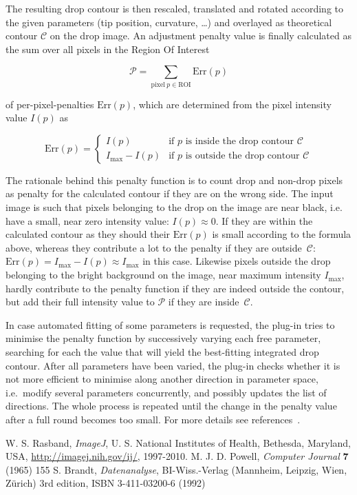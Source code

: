 \documentclass[fleqn]{scrartcl}
\begin{document}
The resulting drop contour is then rescaled, translated and rotated
according to the given parameters (tip position, curvature, \dots) and
overlayed as theoretical contour $\mathcal{C}$ on the drop image. An
adjustment penalty value is finally calculated as the sum over all
pixels in the Region Of Interest

\[
\mathcal{P} = \sum_{\mathrm{pixel}\ p \in \mathrm{ROI}} \mathrm{Err}(p)
\]

\noindent of per-pixel-penalties $\mathrm{Err}(p)$, which are
determined from the pixel intensity value $I(p)$ as

\[
\mathrm{Err}(p) = \left\{ \begin{array}{ll}
I(p) & \textrm{if } p \textrm{ is inside the drop contour } \mathcal{C} \\
I_{\mathrm{max}}-I(p) & 
\textrm{if } p \textrm{ is outside the drop contour } \mathcal{C}
\end{array} \right.
\]

The rationale behind this penalty function is to count drop and
non-drop pixels as penalty for the calculated contour if they are on
the wrong side. The input image is such that pixels belonging to the
drop on the image are near black, i.e. have a small, near zero intensity value: $I(p) \approx 0$. If they are within the calculated contour as they
should their $\mathrm{Err}(p)$ is small according to the formula
above, whereas they contribute a lot to the penalty if they are
outside~$\mathcal{C}$: $\mathrm{Err}(p) = I_{\mathrm{max}} - I(p)
\approx I_{\mathrm{max}}$ in this case. Likewise pixels outside the
drop belonging to the bright background on the image, near maximum
intensity $I_{\mathrm{max}}$, hardly contribute to the penalty
function if they are indeed outside the contour, but add their full
intensity value to $\mathcal{P}$ if they are inside~$\mathcal{C}$.

 In case
automated fitting of some parameters is requested, the plug-in tries
to minimise the penalty function by successively varying each free
parameter, searching for each the value that will yield the
best-fitting integrated drop contour. After all parameters have been
varied, the plug-in checks whether it is not more efficient to
minimise along another direction in parameter space, i.e.\ modify
several parameters concurrently, and possibly updates the list of
directions. The whole process is repeated until the change in the
penalty value after a full round becomes too small. For more details
see references~\cite{Powell1965,Brandt1992}.


 W. S. Rasband, \textit{ImageJ}, U. S. National
  Institutes of Health, Bethesda, Maryland, USA,
  \url{http://imagej.nih.gov/ij/}, 1997-2010.
 M. J. D. Powell, \textit{Computer Journal}
  \textbf{7} (1965) 155
 S. Brandt, \textit{Datenanalyse}, BI-Wiss.-Verlag
  (Mannheim, Leipzig, Wien, Zürich) 3rd edition, ISBN 3-411-03200-6
  (1992)
\end{document}
